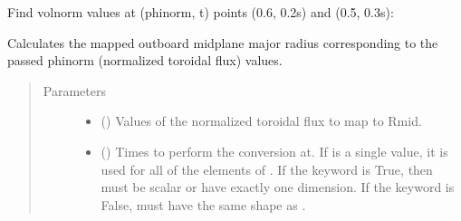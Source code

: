 \documentclass[letterpaper,10pt,english]{sphinxmanual}
\begin{document}
\begin{fulllineitems}
\begin{fulllineitems}
Find volnorm values at (phinorm, t) points (0.6, 0.2s) and (0.5, 0.3s):

\begin{sphinxVerbatim}[commandchars=\\\{\}]
  \PYG{p}{[} \PYG{p}{]} \PYG{p}{[} \PYG{p}{]} 
\end{sphinxVerbatim}

\end{fulllineitems}


\begin{fulllineitems}
\label{\detokenize{eqtools:eqtools.core.Equilibrium.phinorm2rmid}}
Calculates the mapped outboard midplane major radius corresponding to the passed phinorm (normalized toroidal flux) values.
\begin{quote}\begin{description}
\item[{Parameters}] \leavevmode\begin{itemize}
\item {} 
 () \textendash{} Values of the normalized
toroidal flux to map to Rmid.

\item {} 
 () \textendash{} Times to perform the conversion at.
If  is a single value, it is used for all of the elements of
. If the  keyword is True, then  must be scalar
or have exactly one dimension. If the  keyword is False,
 must have the same shape as .


\end{itemize}
\end{description}
\end{quote}
\end{fulllineitems}
\end{fulllineitems}
\end{document}
